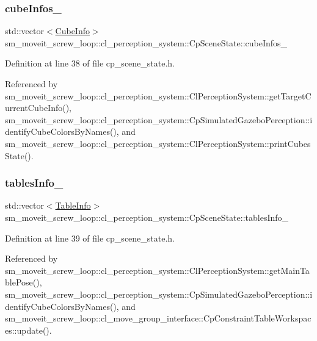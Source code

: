 \subsubsection{\texorpdfstring{cube\+Infos\+\_\+}{cubeInfos\_}}
{\footnotesize\ttfamily std\+::vector$<$\hyperlink{structsm__moveit__screw__loop_1_1cl__perception__system_1_1CubeInfo}{Cube\+Info}$>$ sm\+\_\+moveit\+\_\+screw\+\_\+loop\+::cl\+\_\+perception\+\_\+system\+::\+Cp\+Scene\+State\+::cube\+Infos\+\_\+}



Definition at line 38 of file cp\+\_\+scene\+\_\+state.\+h.



Referenced by sm\+\_\+moveit\+\_\+screw\+\_\+loop\+::cl\+\_\+perception\+\_\+system\+::\+Cl\+Perception\+System\+::get\+Target\+Current\+Cube\+Info(), sm\+\_\+moveit\+\_\+screw\+\_\+loop\+::cl\+\_\+perception\+\_\+system\+::\+Cp\+Simulated\+Gazebo\+Perception\+::identify\+Cube\+Colors\+By\+Names(), and sm\+\_\+moveit\+\_\+screw\+\_\+loop\+::cl\+\_\+perception\+\_\+system\+::\+Cl\+Perception\+System\+::print\+Cubes\+State().

\mbox{\label{classsm__moveit__screw__loop_1_1cl__perception__system_1_1CpSceneState_a13c7fd5645885ad697cedb48edbb3f09}} 
\subsubsection{\texorpdfstring{tables\+Info\+\_\+}{tablesInfo\_}}
{\footnotesize\ttfamily std\+::vector$<$\hyperlink{structsm__moveit__screw__loop_1_1cl__perception__system_1_1TableInfo}{Table\+Info}$>$ sm\+\_\+moveit\+\_\+screw\+\_\+loop\+::cl\+\_\+perception\+\_\+system\+::\+Cp\+Scene\+State\+::tables\+Info\+\_\+}



Definition at line 39 of file cp\+\_\+scene\+\_\+state.\+h.



Referenced by sm\+\_\+moveit\+\_\+screw\+\_\+loop\+::cl\+\_\+perception\+\_\+system\+::\+Cl\+Perception\+System\+::get\+Main\+Table\+Pose(), sm\+\_\+moveit\+\_\+screw\+\_\+loop\+::cl\+\_\+perception\+\_\+system\+::\+Cp\+Simulated\+Gazebo\+Perception\+::identify\+Cube\+Colors\+By\+Names(), and sm\+\_\+moveit\+\_\+screw\+\_\+loop\+::cl\+\_\+move\+\_\+group\+\_\+interface\+::\+Cp\+Constraint\+Table\+Workspaces\+::update().



